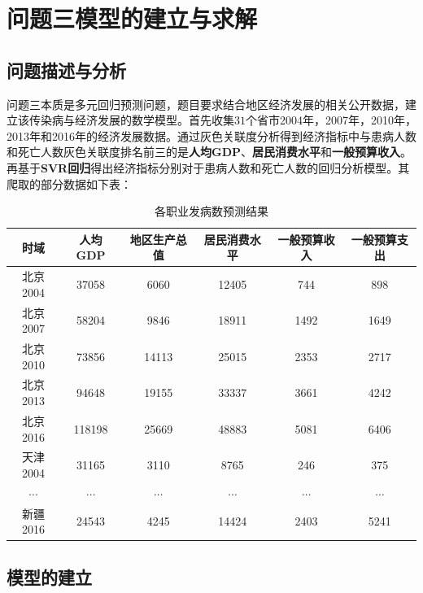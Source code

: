\documentclass{whutmod}
\begin{document}
     	\section{问题三模型的建立与求解}
     \subsection{问题描述与分析}
            问题三本质是多元回归预测问题，题目要求结合地区经济发展的相关公开数据，建立该传染病与经济发展的数学模型。首先收集$31$个省市2004年，2007年，2010年，2013年和2016年的经济发展数据。通过灰色关联度分析得到经济指标中与患病人数和死亡人数灰色关联度排名前三的是\textbf{人均GDP}、\textbf{居民消费水平}和\textbf{一般预算收入}。再基于\textbf{SVR回归}得出经济指标分别对于患病人数和死亡人数的回归分析模型。其爬取的部分数据如下表：
             \begin{table}[H]
    	\centering\caption{各职业发病数预测结果}\label{s2ss}
    	\begin{tabular}{cccccc}
    		\toprule[1.5pt]
    		\multicolumn{1}{m{1.8cm}}{\centering 时域
    		}
    		& \multicolumn{1}{m{1.8cm}}{\centering 人均GDP}
    		& \multicolumn{1}{m{1.8cm}}{\centering 地区生产总值}
    		& \multicolumn{1}{m{1.8cm}}{\centering 居民消费水平
    		}
    		& \multicolumn{1}{m{1.8cm}}{\centering 一般预算收入
    		}
      		& \multicolumn{1}{m{1.8cm}}{\centering 一般预算支出
      		}
    		  
    		\\
    		\midrule[0.5pt]	
    		北京2004 & 37058 &6060&12405&744&898
    		\\ 
    		北京2007 & 58204&9846&18911&1492&1649\\
    		北京2010 &73856 &14113&25015&2353&2717\\
    		北京2013 & 94648&19155&33337&3661&4242\\
    		北京2016 & 118198&25669&48883&5081&6406\\
    		天津2004 &31165 &3110&8765&246&375\\
    		$\cdots$ &$\cdots$ &$\cdots$&$\cdots$&$\cdots$&$\cdots$\\
    		新疆2016 &24543 &4245&14424&2403&5241\\
    		\bottomrule[1.5pt]	
    	\end{tabular}
    \end{table}
     
     
     \subsection{模型的建立}
\end{document}

